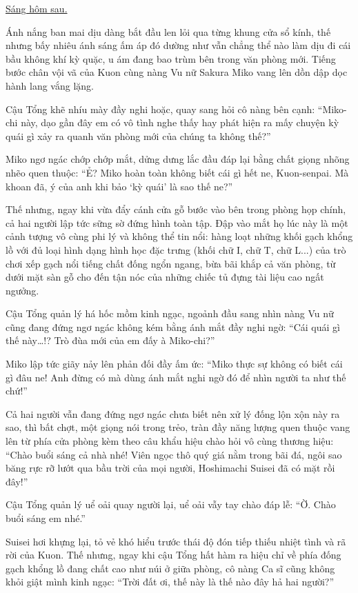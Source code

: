 \documentclass[../main.tex]{subfiles}
\begin{document}
\begin{center}
  \uline{Sáng hôm sau.}
\end{center}

Ánh nắng ban mai dịu dàng bắt đầu len lỏi qua từng khung cửa sổ kính, thế nhưng bấy nhiêu ánh sáng ấm áp đó dường như vẫn chẳng thể nào làm dịu đi cái bầu không khí kỳ quặc, u ám đang bao trùm bên trong văn phòng mới. Tiếng bước chân vội vã của Kuon cùng nàng Vu nữ Sakura Miko vang lên dồn dập dọc hành lang vắng lặng.

Cậu Tổng khẽ nhíu mày đầy nghi hoặc, quay sang hỏi cô nàng bên cạnh: ``Miko-chi này, dạo gần đây em có vô tình nghe thấy hay phát hiện ra mấy chuyện kỳ quái gì xảy ra quanh văn phòng mới của chúng ta không thế?''

Miko ngơ ngác chớp chớp mắt, dửng dưng lắc đầu đáp lại bằng chất giọng nhõng nhẽo quen thuộc: ``Ẻ? Miko hoàn toàn không biết cái gì hết ne, Kuon-senpai. Mà khoan đã, ý của anh khi bảo `kỳ quái' là sao thế ne?''

Thế nhưng, ngay khi vừa đẩy cánh cửa gỗ bước vào bên trong phòng họp chính, cả hai người lập tức sững sờ đứng hình toàn tập. Đập vào mắt họ lúc này là một cảnh tượng vô cùng phi lý và không thể tin nổi: hàng loạt những khối gạch khổng lồ với đủ loại hình dạng hình học đặc trưng (khối chữ I, chữ T, chữ L...) của trò chơi xếp gạch nổi tiếng chất đống ngổn ngang, bừa bãi khắp cả văn phòng, từ dưới mặt sàn gỗ cho đến tận nóc của những chiếc tủ đựng tài liệu cao ngất ngưởng.

Cậu Tổng quản lý há hốc mồm kinh ngạc, ngoảnh đầu sang nhìn nàng Vu nữ cũng đang đứng ngơ ngác không kém bằng ánh mắt đầy nghi ngờ: ``Cái quái gì thế này\dots!? Trò đùa mới của em đấy à Miko-chi?''

Miko lập tức giãy nảy lên phản đối đầy ấm ức: ``Miko thực sự không có biết cái gì đâu ne! Anh đừng có mà dùng ánh mắt nghi ngờ đó để nhìn người ta như thế chứ!''

Cả hai người vẫn đang đứng ngơ ngác chưa biết nên xử lý đống lộn xộn này ra sao, thì bất chợt, một giọng nói trong trẻo, tràn đầy năng lượng quen thuộc vang lên từ phía cửa phòng kèm theo câu khẩu hiệu chào hỏi vô cùng thương hiệu: ``Chào buổi sáng cả nhà nhé! Viên ngọc thô quý giá nằm trong bãi đá, ngôi sao băng rực rỡ lướt qua bầu trời của mọi người, Hoshimachi Suisei đã có mặt rồi đây!''

Cậu Tổng quản lý uể oải quay người lại, uể oải vẫy tay chào đáp lễ: ``Ờ. Chào buổi sáng em nhé.''

Suisei hơi khựng lại, tỏ vẻ khó hiểu trước thái độ đón tiếp thiếu nhiệt tình và rã rời của Kuon. Thế nhưng, ngay khi cậu Tổng hất hàm ra hiệu chỉ về phía đống gạch khổng lồ đang chất cao như núi ở giữa phòng, cô nàng Ca sĩ cũng không khỏi giật mình kinh ngạc: ``Trời đất ơi, thế này là thế nào đây hả hai người?''
\end{document}
